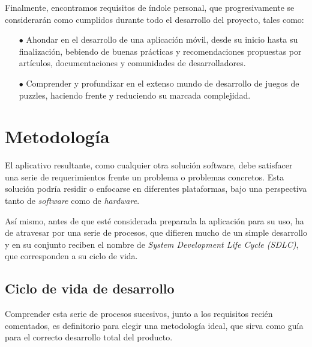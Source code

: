 \documentclass[11pt,spanish,listoffigures,listoftables]{tfgetsinf}
\begin{document}
Finalmente, encontramos requisitos de índole personal, que progresivamente se considerarán como cumplidos durante todo el desarrollo del proyecto,
tales como:

\begin{itemize}
   \item[$\bullet$] Ahondar en el desarrollo de una aplicación móvil, desde su inicio hasta su finalización,
   bebiendo de buenas prácticas y recomendaciones propuestas por artículos, documentaciones y comunidades de desarrolladores.
   \item[$\bullet$] Comprender y profundizar en el extenso mundo de desarrollo de juegos de puzzles, haciendo frente y reduciendo su
   marcada complejidad.
\end{itemize}

\section{Metodología}

El aplicativo resultante, como cualquier otra solución software, debe satisfacer una serie de requerimientos frente un problema
o problemas concretos. %
Esta solución podría residir o enfocarse en diferentes plataformas, bajo una perspectiva
tanto de \textit{software} como de \textit{hardware}.

Así mismo, antes de que esté considerada preparada la aplicación para su uso, ha de atravesar por una serie de procesos,
que difieren mucho de un simple desarrollo y en su conjunto reciben el nombre de \textit{System Development Life Cycle (SDLC)},
que corresponden a su ciclo de vida.

\subsection{Ciclo de vida de desarrollo}
Comprender esta serie de procesos sucesivos, junto a los requisitos recién comentados, es definitorio para elegir una metodología ideal,
que sirva como guía para el correcto desarrollo total del producto.
\end{document}
